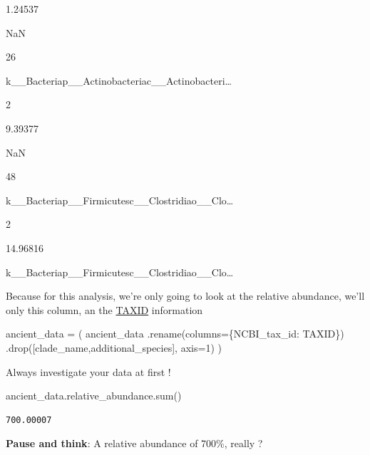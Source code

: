 \documentclass[
  letterpaper,
]{book}
\newenvironment{Shaded}{}{}
\newcommand{\BuiltInTok}[1]{\textcolor[rgb]{0.84,0.23,0.29}{#1}}
\newcommand{\DecValTok}[1]{\textcolor[rgb]{0.00,0.36,0.77}{#1}}
\newcommand{\NormalTok}[1]{\textcolor[rgb]{0.14,0.16,0.18}{#1}}
\newcommand{\OperatorTok}[1]{\textcolor[rgb]{0.14,0.16,0.18}{#1}}
\newcommand{\StringTok}[1]{\textcolor[rgb]{0.01,0.18,0.38}{#1}}
\begin{document}
1.24537

NaN

26

k\_\_Bacteria\textbar p\_\_Actinobacteria\textbar c\_\_Actinobacteri\ldots{}

2

9.39377

NaN

48

k\_\_Bacteria\textbar p\_\_Firmicutes\textbar c\_\_Clostridia\textbar o\_\_Clo\ldots{}

2

14.96816

k\_\_Bacteria\textbar p\_\_Firmicutes\textbar c\_\_Clostridia\textbar o\_\_Clo\ldots{}

Because for this analysis, we're only going to look at the relative
abundance, we'll only this column, an the
\href{https://www.ncbi.nlm.nih.gov/taxonomy}{TAXID} information

\begin{Shaded}
\begin{Highlighting}[]
\NormalTok{ancient\_data }\OperatorTok{=}\NormalTok{ (}
\NormalTok{    ancient\_data}
\NormalTok{    .rename(columns}\OperatorTok{=}\NormalTok{\{}\StringTok{\textquotesingle{}NCBI\_tax\_id\textquotesingle{}}\NormalTok{: }\StringTok{\textquotesingle{}TAXID\textquotesingle{}}\NormalTok{\})}
\NormalTok{    .drop([}\StringTok{\textquotesingle{}clade\_name\textquotesingle{}}\NormalTok{,}\StringTok{\textquotesingle{}additional\_species\textquotesingle{}}\NormalTok{], axis}\OperatorTok{=}\DecValTok{1}\NormalTok{)}
\NormalTok{)}
\end{Highlighting}
\end{Shaded}

Always investigate your data at first !

\begin{Shaded}
\begin{Highlighting}[]
\NormalTok{ancient\_data.relative\_abundance.}\BuiltInTok{sum}\NormalTok{()}
\end{Highlighting}
\end{Shaded}

\begin{verbatim}
700.00007
\end{verbatim}

\textbf{Pause and think}: A relative abundance of 700\%, really ?
\end{document}
